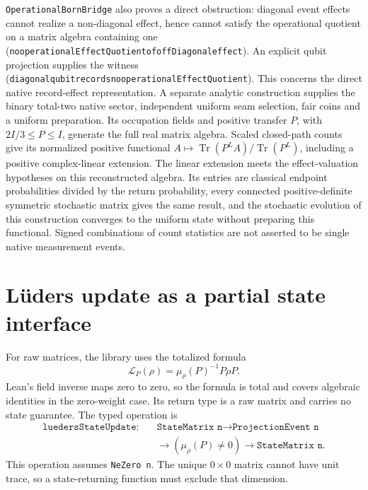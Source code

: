 \documentclass[11pt]{article}
\renewcommand{\_}{\textunderscore\allowbreak}
\theoremstyle{remark}
\newcommand{\lued}{\mathcal L}
\begin{document}
\texttt{OperationalBornBridge} also proves a direct obstruction: diagonal event effects cannot
realize a non-diagonal effect, hence cannot satisfy the operational quotient
on a matrix algebra containing one
(\texttt{no\_operationalEffectQuotient\_of\_offDiagonal\_effect}). An explicit
qubit projection supplies the witness
(\texttt{diagonal\_qubit\_records\_no\_operationalEffectQuotient}). This concerns
the direct native record-effect representation.
A separate analytic construction supplies the binary total-two native sector,
independent uniform seam selection, fair coins and a uniform preparation. Its
occupation fields and positive transfer $P$, with $2I/3\leq P\leq I$, generate
the full real matrix algebra. Scaled closed-path counts give its normalized
positive functional $A\mapsto\operatorname{Tr}(P^L A)/\operatorname{Tr}(P^L)$,
including a positive complex-linear extension. The linear extension meets the
effect-valuation hypotheses on this reconstructed algebra. Its entries are
classical endpoint probabilities divided by the return probability, every
connected positive-definite symmetric stochastic matrix gives the same result,
and the stochastic evolution of this construction converges to the uniform
state without preparing this functional. Signed combinations of count statistics are not asserted to be
single native measurement events.

\section{L\"uders update as a partial state interface}
\label{sec:lueders}

For raw matrices, the library uses the totalized formula
\[
 \lued_P(\rho)=\mu_\rho(P)^{-1}P\rho P.
\]
Lean's field inverse maps zero to zero, so the formula is total and covers
algebraic identities in the zero-weight case. Its return type is a raw matrix
and carries no state guarantee. The typed operation is
\[
\begin{aligned}
\texttt{luedersStateUpdate}:\quad&
 \texttt{StateMatrix n}\to\texttt{ProjectionEvent n}\\
 &\to(\mu_\rho(P)\ne0)\to\texttt{StateMatrix n}.
\end{aligned}
\]
This operation assumes \texttt{NeZero n}. The unique $0\times0$ matrix cannot
have unit trace, so a state-returning function must exclude that dimension.
\end{document}
